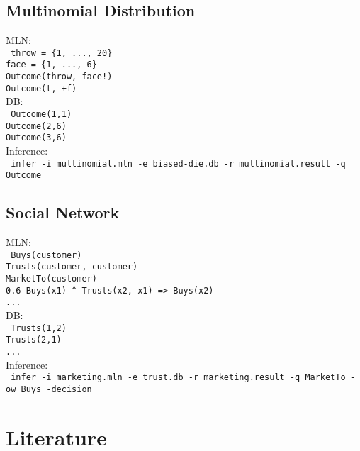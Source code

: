 \documentclass{beamer}
\begin{document}
\subsection{Multinomial Distribution}
\begin{frame}{\insertsubsection}
MLN:\\
\texttt{\small
  throw = \{1, ..., 20\}\\
  face  = \{1, ..., 6\}\\
  Outcome(throw, face!)\\
  Outcome(t, +f)}\\
\vspace{0.5cm}
DB:\\
\texttt{\small
  Outcome(1,1)\\
  Outcome(2,6)\\
  Outcome(3,6)}\\
\vspace{0.5cm}
Inference:\\
\texttt{\small
  infer -i multinomial.mln -e biased-die.db -r multinomial.result -q Outcome}
\end{frame}


\subsection{Social Network}
\begin{frame}{\insertsubsection}
MLN:\\
\texttt{\small
Buys(customer)\\
Trusts(customer, customer)\\
MarketTo(customer)\\
0.6 Buys(x1) \textasciicircum{} Trusts(x2, x1) => Buys(x2)\\
...}\\
\vspace{0.5cm}
DB:\\
\texttt{\small
Trusts(1,2)\\
Trusts(2,1)\\
...}\\
\vspace{0.5cm}
Inference:\\
\texttt{\small
  infer -i marketing.mln -e trust.db -r marketing.result -q MarketTo -ow Buys -decision}
\end{frame}

\section{Literature}
\begin{frame}{\insertsection}
  
  
\end{frame}
\end{document}
